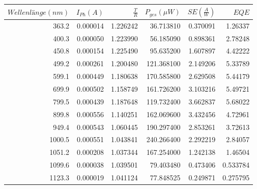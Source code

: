\begin{center}
\begin{tabular}{rrrrrr}
    $Wellenlänge (nm)$ &  $I_{Ph} (A)$ &    $\frac{T}{R}$ &  $P_{ges} (\mu W)$ &  $SE (\frac{A}{W})$ &       $EQE$ \\
    \hline
    363.2 &  0.000014 &  1.226242 &   36.713810 &  0.370091 &   1.26337 \\
    400.3 &  0.000050 &  1.223990 &   56.185090 &  0.898361 &   2.78248 \\
    450.8 &  0.000154 &  1.225490 &   95.635200 &  1.607897 &   4.42222 \\
    499.2 &  0.000261 &  1.200480 &  121.368100 &  2.149206 &   5.33789 \\
    599.1 &  0.000449 &  1.180638 &  170.585800 &  2.629508 &   5.44179 \\
    699.9 &  0.000502 &  1.158749 &  161.726200 &  3.103216 &   5.49721 \\
    799.5 &  0.000439 &  1.187648 &  119.732400 &  3.662837 &   5.68022 \\
    899.8 &  0.000556 &  1.140251 &  162.069600 &  3.432456 &   4.72961 \\
    949.4 &  0.000543 &  1.060445 &  190.297400 &  2.853261 &   3.72613 \\
    1000.5 &  0.000551 &  1.043841 &  240.266400 &  2.292219 &   2.84057 \\
    1051.2 &  0.000208 &  1.037344 &  167.254000 &  1.242138 &   1.46504 \\
    1099.6 &  0.000038 &  1.039501 &   79.403480 &  0.473406 &  0.533784 \\
    1123.3 &  0.000019 &  1.041124 &   77.848525 &  0.249871 &  0.275795 \\
\end{tabular}
\label{tab:32multi}
\end{center}

